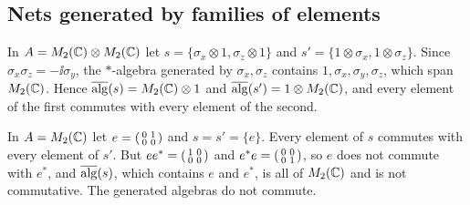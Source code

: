 \subsection{Nets generated by families of elements}

\noindent{}

\begin{extra}
\begin{example}\label{ex:two-qubits}
In $A=M_2(\mathbb C)\otimes M_2(\mathbb C)$ let $s=\{\sigma_x\otimes1,\sigma_z\otimes1\}$ and
$s'=\{1\otimes\sigma_x,1\otimes\sigma_z\}$. Since
$\sigma_x\sigma_z=-\ii\sigma_y$, the $*$-algebra generated by $\sigma_x,\sigma_z$ contains
$1,\sigma_x,\sigma_y,\sigma_z$, which span $M_2(\mathbb C)$. Hence $\overline{\operatorname{alg}}(s)=M_2(\mathbb C)\otimes1$ and
$\overline{\operatorname{alg}}(s')=1\otimes M_2(\mathbb C)$, and every element of the first commutes with every element of the
second.
\end{example}
\end{extra}

\begin{extra}
\begin{example}\label{ex:nilpotent}
In $A=M_2(\mathbb C)$ let $e=\begin{psmallmatrix}0&1\\0&0\end{psmallmatrix}$ and $s=s'=\{e\}$. Every
element of $s$ commutes with every element of $s'$. But $ee^*=\begin{psmallmatrix}1&0\\0&0
\end{psmallmatrix}$ and $e^*e=\begin{psmallmatrix}0&0\\0&1\end{psmallmatrix}$, so $e$ does not
commute with $e^*$, and $\overline{\operatorname{alg}}(s)$, which contains $e$ and $e^*$, is all of $M_2(\mathbb C)$ and is not
commutative. The generated algebras do not commute.
\end{example}
\end{extra}

\noindent{}

